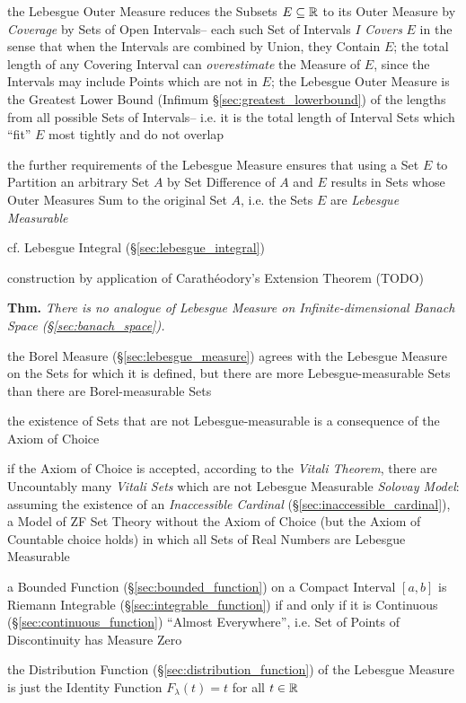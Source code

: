 the Lebesgue Outer Measure reduces the Subsets $E \subseteq \mathbb{R}$ to its Outer
Measure by \emph{Coverage} by Sets of Open Intervals-- each such Set of
Intervals $I$ \emph{Covers} $E$ in the sense that when the Intervals are
combined by Union, they Contain $E$; the total length of any Covering Interval
can \emph{overestimate} the Measure of $E$, since the Intervals may include
Points which are not in $E$; the Lebesgue Outer Measure is the Greatest Lower
Bound (Infimum \S\ref{sec:greatest_lowerbound}) of the lengths from all possible
Sets of Intervals-- i.e. it is the total length of Interval Sets which ``fit''
$E$ most tightly and do not overlap

the further requirements of the Lebesgue Measure ensures that using a Set $E$ to
Partition an arbitrary Set $A$ by Set Difference of $A$ and $E$ results in Sets
whose Outer Measures Sum to the original Set $A$, i.e. the Sets $E$ are
\emph{Lebesgue Measurable}

\fist cf. Lebesgue Integral (\S\ref{sec:lebesgue_integral})

construction by application of Carath\'eodory's Extension Theorem (TODO)

\textbf{Thm.} \emph{
  There is no analogue of Lebesgue Measure on Infinite-dimensional Banach Space
  (\S\ref{sec:banach_space}).
}

the Borel Measure (\S\ref{sec:lebesgue_measure}) agrees with the Lebesgue
Measure on the Sets for which it is defined, but there are more
Lebesgue-measurable Sets than there are Borel-measurable Sets

the existence of Sets that are not Lebesgue-measurable is a consequence of the
Axiom of Choice

if the Axiom of Choice is accepted, according to the \emph{Vitali Theorem},
there are Uncountably many \emph{Vitali Sets} which are not Lebesgue Measurable
\emph{Solovay Model}: assuming the existence of an \emph{Inaccessible Cardinal}
(\S\ref{sec:inaccessible_cardinal}), a Model of ZF Set Theory without the Axiom
of Choice (but the Axiom of Countable choice holds) in which all Sets of Real
Numbers are Lebesgue Measurable

a Bounded Function (\S\ref{sec:bounded_function}) on a Compact Interval $[a,b]$
is Riemann Integrable (\S\ref{sec:integrable_function}) if and only if it is
Continuous (\S\ref{sec:continuous_function}) ``Almost Everywhere'', i.e. Set of
Points of Discontinuity has Measure Zero

the Distribution Function (\S\ref{sec:distribution_function}) of the Lebesgue
Measure is just the Identity Function $F_\lambda(t) = t$ for all $t \in \mathbb{R}$



